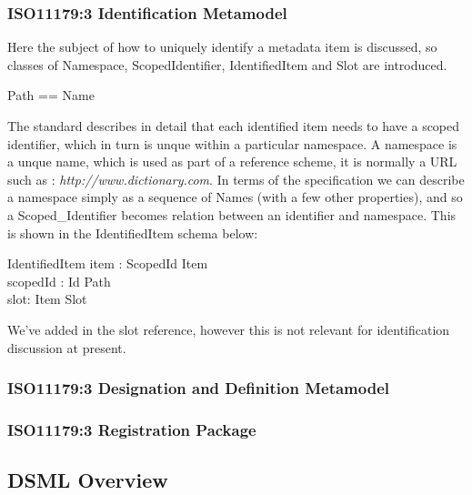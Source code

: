 \documentclass{llncs}
\begin{document}
\subsubsection{ISO11179:3 Identification Metamodel }
Here the subject of how to uniquely identify a metadata item is discussed, so classes of Namespace, ScopedIdentifier, IdentifiedItem and Slot are introduced.

\begin{zed}
  Path == \seq Name \\
  [Item, ScopedId, Slot, Organization, Namespace]
  \end{zed}


The standard describes in detail that each identified item needs to have a scoped identifier, which in turn is unque within a particular namespace. A namespace is a unque name, which is used as part of a reference scheme, it is normally a URL such as : \emph{http://www.dictionary.com}. In terms of the specification we can describe a namespace simply as a sequence of Names (with a few other properties), and so a Scoped\_Identifier becomes relation between an identifier and namespace. This is shown in the IdentifiedItem schema below: 


\begin{schema}{IdentifiedItem}
  item : ScopedId \pfun Item \\
  scopedId : Id \pfun Path \\
  slot: Item \pfun Slot
\end{schema}

We've added in the slot reference, however this is not relevant for identification discussion at present.



 





\subsubsection{ISO11179:3 Designation and Definition Metamodel}
\subsubsection{ISO11179:3 Registration Package}



\subsection{DSML Overview}
\end{document}
